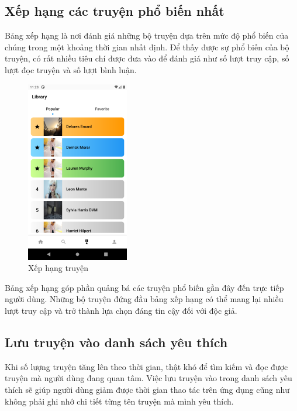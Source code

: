 \documentclass[./../main.tex]{subfiles}
\begin{document}
\subsection{Xếp hạng các truyện phổ biến nhất}
Bảng xếp hạng là nơi đánh giá những bộ truyện dựa trên mức độ phổ biến của chúng trong một khoảng thời gian nhất định. Để thấy được sự phổ biến của bộ truyện, có rất nhiều tiêu chí được đưa vào để đánh giá như số lượt truy cập, số lượt đọc truyện và số lượt bình luận.

\begin{figure}[!htb]
	\centering
	\includegraphics[width=0.5\linewidth]{./images/ranking.png}
	\caption{Xếp hạng truyện}
\end{figure}

Bảng xếp hạng góp phần quảng bá các truyện phổ biến gần đây đến trực tiếp người dùng. Những bộ truyện đứng đầu bảng xếp hạng có thể mang lại nhiều lượt truy cập và trở thành lựa chọn đáng tin cậy đối với độc giả.
\subsection{Lưu truyện vào danh sách yêu thích}
Khi số lượng truyện tăng lên theo thời gian, thật khó để tìm kiếm và đọc được truyện mà người dùng đang quan tâm. Việc lưu truyện vào trong danh sách yêu thích sẽ giúp người dùng giảm được thời gian thao tác trên ứng dụng cũng như không phải ghi nhớ chi tiết từng tên truyện mà mình yêu thích.
\end{document}
